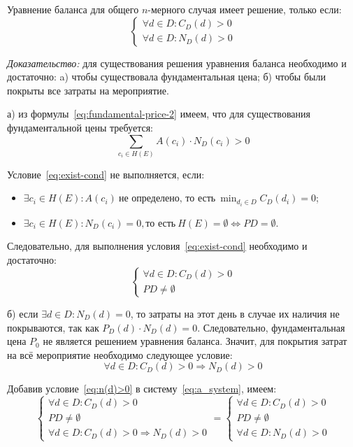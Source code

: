 Уравнение баланса для общего $n$-мерного случая имеет решение, только если:
\begin{equation}
	\begin{cases}
		\forall d \in D: C_D(d) > 0 \\
		\forall d \in D: N_D(d) > 0
	\end{cases}
\end{equation}

\textit{Доказательство:} для существования решения уравнения баланса необходимо и достаточно: a) чтобы существовала фундаментальная цена; б) чтобы были покрыты все затраты на мероприятие. 

а) из формулы~\ref{eq:fundamental-price-2} имеем, что для существования фундаментальной цены требуется:
\begin{equation}
	\sum_{c_i \in H(E)}{A(c_i) \cdot N_D(c_i)} > 0
	\label{eq:exist-cond}
\end{equation}

Условие~\ref{eq:exist-cond} не выполняется, если:
\begin{itemize}[label=--]
	\item $\exists c_i \in H(E): A(c_i) \ \text{не определено, то есть} \ \min_{d_i \in D}{C_D(d_i)} = 0$;
	\item $\exists c_i \in H(E): N_D(c_i) = 0, \text{то есть} \ H(E) = \emptyset \Leftrightarrow PD = \emptyset$.
\end{itemize}

Следовательно, для выполнения условия~\ref{eq:exist-cond} необходимо и достаточно:
\begin{equation}
	\begin{cases}
		\forall d \in D: C_D(d) > 0 \\
		PD \ne \emptyset
	\end{cases}
	\label{eq:a_system}
\end{equation}

б) если $\exists d \in D: N_D(d) = 0$, то затраты на этот день в случае их наличия не покрываются, так как $P_D(d) \cdot N_D(d) = 0$. Следовательно, фундаментальная цена $P_0$ не является решением уравнения баланса. Значит, для покрытия затрат на всё мероприятие необходимо следующее условие:
\begin{equation}
	\forall d \in D: C_D(d) > 0 \Rightarrow N_D(d) > 0
	\label{eq:n(d)>0}
\end{equation}

Добавив условие~\ref{eq:n(d)>0} в систему~\ref{eq:a_system}, имеем:
\begin{equation}
	\begin{cases}
		\forall d \in D: C_D(d) > 0 \\
		PD \ne \emptyset \\
		\forall d \in D: C_D(d) > 0 \Rightarrow N_D(d) > 0
	\end{cases} 
	=
	\begin{cases}
		\forall d \in D: C_D(d) > 0 \\
		PD \ne \emptyset \\
		\forall d \in D: N_D(d) > 0
	\end{cases}
\end{equation}

